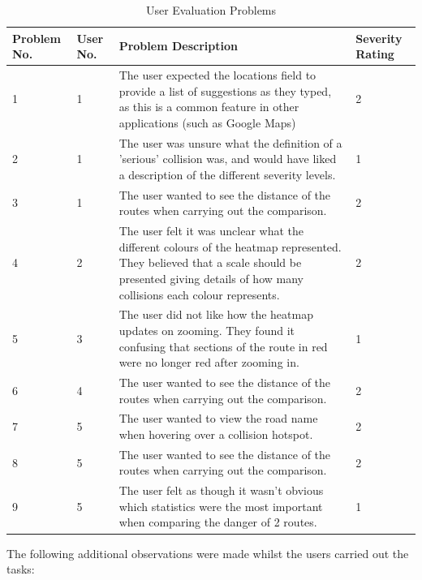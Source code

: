 \documentclass[authoryearcitations]{UoYCSproject}
\begin{document}
\begin{table}
\caption{User Evaluation Problems}
\begin{tabular}{| p{1.5cm} | p{1.5cm} | p{9cm} | p{1.5cm} |}
	\hline
	\textbf{Problem No.} & \textbf{User No.} & \textbf{Problem Description} & \textbf{Severity Rating} \\ \hline
	1 & 1 & The user expected the locations field to provide a list of suggestions as they typed, as this is a common feature in other applications (such as Google Maps)  & 2 \\ \hline
	2 & 1 & The user was unsure what the definition of a 'serious' collision was, and would have liked a description of the different severity levels. & 1 \\ \hline
	3 & 1 & The user wanted to see the distance of the routes when carrying out the comparison. & 2 \\ \hline
	4 & 2 & The user felt it was unclear what the different colours of the heatmap represented. They believed that a scale should be presented giving details of how many collisions each colour represents. & 2 \\ \hline
	5 & 3 & The user did not like how the heatmap updates on zooming. They found it confusing that sections of the route in red were no longer red after zooming in.  & 1 \\ \hline
	6 & 4 & The user wanted to see the distance of the routes when carrying out the comparison. & 2 \\ \hline
	7 & 5 & The user wanted to view the road name when hovering over a collision hotspot. & 2 \\ \hline
	8 & 5 & The user wanted to see the distance of the routes when carrying out the comparison. & 2 \\ \hline
	9 & 5 & The user felt as though it wasn't obvious which statistics were the most important when comparing the danger of 2 routes. & 1 \\ \hline
\end{tabular}
\label{tab:userevalprobs}
\end{table}

The following additional observations were made whilst the users carried out the tasks:
\end{document}
